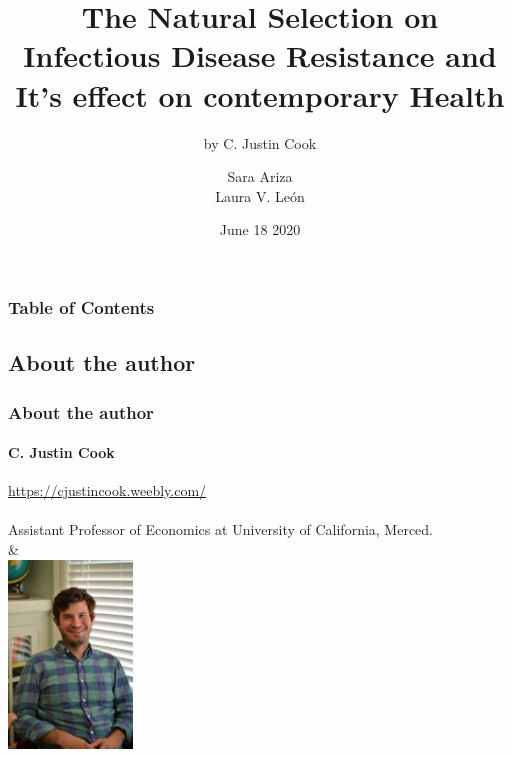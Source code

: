 \documentclass[pdftex,12pt,xcolor=pdftex,table]{beamer}
\title[Natural Selection on Infectious Disease]{The Natural Selection on Infectious Disease Resistance and It's effect on contemporary Health}
\subtitle{\footnotesize{by C. Justin Cook}}
\institute{Economic Growth and Comparative Development}
\author{Sara Ariza \\ Laura V. León}
\date{June 18 2020}
\theoremstyle{definition}
\theoremstyle{remark}
\numberwithin{equation}{section}
\numberwithin{figure}{section}
\begin{document}
\begin{frame}%
\titlepage
\end{frame}


%


%
%

\begin{frame}
\frametitle{Table of Contents}
\tableofcontents
\end{frame}
\begin{frame}\section{About the author}
\justifying
\frametitle{About the author}
\framesubtitle{C. Justin Cook}
\url{https://cjustincook.weebly.com/}\\~\\
\thinspace
Assistant Professor of Economics at University of California, Merced.\\&\\
\includegraphics[height=5cm]{autor.jpg}
\centering
\end{frame}
\end{document}
